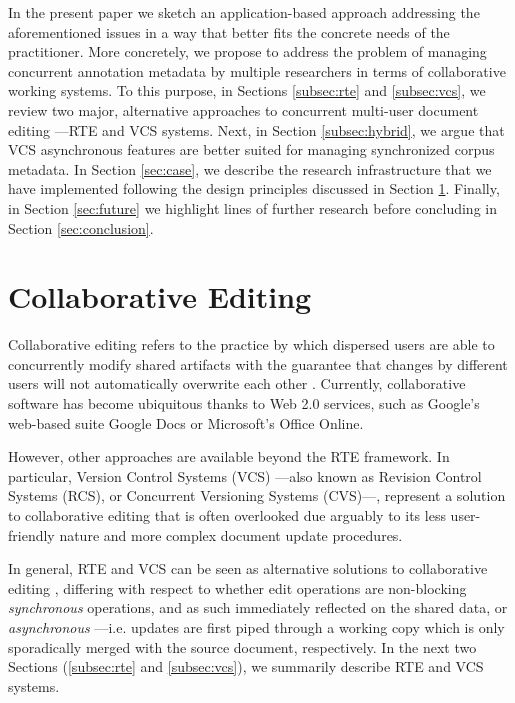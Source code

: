 \documentclass{sig-alternate}
\begin{document}
In the present paper we sketch an application-based approach addressing the aforementioned
issues in a way that better fits the concrete needs of the practitioner.
More concretely, we propose to address the problem of managing concurrent annotation
metadata by multiple researchers in terms of collaborative working systems.
To this purpose, in Sections \ref{subsec:rte} and \ref{subsec:vcs}, we review two major,
alternative approaches to concurrent multi-user document editing ---RTE and VCS systems.
Next, in Section \ref{subsec:hybrid}, we argue that VCS asynchronous features are better suited
for managing synchronized corpus metadata.
In Section \ref{sec:case}, we describe the research infrastructure that we have implemented
following the design principles discussed in Section \ref{sec:cde}.
Finally, in Section \ref{sec:future} we highlight lines of further research before
concluding in Section \ref{sec:conclusion}.

\section{Collaborative Editing}\label{sec:cde}
Collaborative editing refers to the practice by which dispersed
users are able to concurrently modify shared artifacts with the guarantee that changes
by different users will not automatically overwrite each other \cite{Altmanninger2009}.
Currently, collaborative software has become ubiquitous thanks to Web 2.0 services, such as
Google's web-based suite Google Docs or Microsoft's Office Online.

However, other approaches are available beyond the RTE framework. In
particular, Version Control Systems (VCS) ---also known as Revision Control
Systems (RCS), or Concurrent Versioning Systems (CVS)---, represent a solution
to collaborative editing that is often overlooked due arguably to its less user-friendly
nature and more complex document update procedures.

In general, RTE and VCS can be seen as alternative solutions to collaborative
editing \cite{Altmanninger2009}, differing with respect to whether edit
operations are non-blocking \textit{synchronous} operations, and as such immediately reflected on the
shared data, or \textit{asynchronous} ---i.e. updates are first piped
through a working copy which is only sporadically merged with the source document, respectively.
In the next two Sections (\ref{subsec:rte} and \ref{subsec:vcs}), we summarily describe RTE
and VCS systems.
\end{document}
